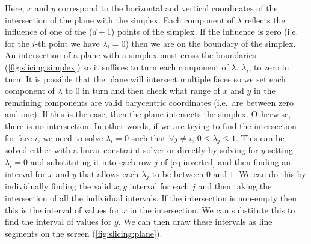 Here, $x$ and $y$ correspond to the horizontal and vertical coordinates of the
intersection of the plane with the simplex. Each component of $\lambda$
reflects the influence of one of the ($d+1$) points of the simplex. If the
influence is zero (i.e. for the $i$-th point we have $\lambda_i=0$) then we are on
the boundary of the simplex.  An intersection of a plane with a
simplex must cross the boundaries
(\autoref{fig:slicing:simplex}) so it suffices to turn each
component of $\lambda$, $\lambda_i$, to zero in turn.  It is possible that the plane will
intersect multiple faces so we set each component of $\lambda$ to $0$ in turn
and then check what range of $x$ and $y$ in the remaining components are valid
barycentric coordinates (i.e.\ are between zero and one).  If this is the case,
then the plane intersects the simplex.  Otherwise, there is no intersection. In
other words, if we are trying to find the intersection for face $i$, we need to
solve $\lambda_i = 0$ such that $\forall j \ne i$, $0 \le \lambda_j \le 1$.
This can be solved either with a linear constraint solver or directly by
solving for $y$ setting $\lambda_i = 0$ and substituting it into each row $j$ of \autoref{eq:inverted}
and then finding an interval for $x$ and $y$ that allows each
$\lambda_j$ to be between $0$ and $1$.  We can do this by individually finding
the valid $x, y$ interval for each $j$ and then taking the intersection of all the
individual intervals. If the intersection is non-empty then this is the interval
of values for $x$ in the intersection. We can substitute this to find the
interval of values for $y$. We can then draw these intervals as line segments
on the screen (\autoref{fig:slicing:plane}). 

